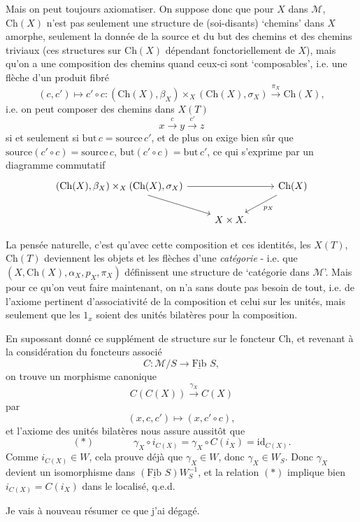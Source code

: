 \documentclass[11pt]{article}
\newcommand{\printedpage}[1]{\marginpar{\footnotesize p.~#1}}
\newcommand{\msp}[1]{\marginpar{\footnotesize [#1]}}
\newcommand{\Fib}{\underline{\mathrm{Fib}}\,}
\newcommand{\Ch}{\mathrm{Ch}}
\begin{document}
Mais on peut toujours axiomatiser. On suppose donc que pour $X$ dans $\mathcal{M}$, $\Ch(X)$
\msp{page 106}
n'est pas seulement une structure de (soi-disants) ‘chemins’ dans $X$ amorphe, seulement la donnée de la source et du but des chemins et des chemins triviaux (ces structures sur $\Ch(X)$ dépendant fonctoriellement de $X$), mais qu'on a une composition des chemins quand ceux-ci sont ‘composables’, i.e. une flèche d'un produit fibré
\[
(c,c')\longmapsto c'\circ c : (\Ch(X),\beta_X)\times_X(\Ch(X),\sigma_X)\xrightarrow{\pi_X}\Ch(X),
\]
i.e. on peut composer des chemins dans $X(T)$
\[
x\xrightarrow{c}y\xrightarrow{c'}z
\]
si et seulement si $\text{but}\,c=\text{source}\,c'$, et de plus on exige bien sûr que $\text{source}(c'\circ c)=\text{source}\,c$, $\text{but}(c'\circ c)=\text{but}\,c'$, ce qui s'exprime par un diagramme commutatif
\[
\begin{tikzcd}
(\Ch(X),\beta_X)\times_X(\Ch(X),\sigma_X) \arrow[rr] \arrow[dr] & & \Ch(X) \arrow[dl, "p_X"] \\
 & X\times X. &
\end{tikzcd}
\]


\printedpage{67}

La pensée naturelle, c'est qu'avec cette composition et ces identités, les $X(T)$, $\Ch(T)$ deviennent les objets et les flèches d'une \textit{catégorie} - i.e. que $(X,\Ch(X),\alpha_X,p_X,\pi_X)$ définissent une structure de ‘catégorie dans $\mathcal{M}$’. Mais pour ce qu'on veut faire maintenant, on n'a sans doute pas besoin de tout, i.e.
\msp{page 107}
de l'axiome pertinent d'associativité de la composition et celui sur les unités, mais seulement que les $1_x$ soient des unités bilatères pour la composition.

En supossant donné ce supplément de structure sur le foncteur Ch, et revenant à la considération du foncteurs associé %
\[
C : \mathcal{M}/S\longrightarrow\Fib\,S,
\]
on trouve un morphisme canonique
\[
C(C(X))\xrightarrow{\gamma_X}C(X)
\]
par
\[
(x,c,c')\longmapsto(x,c'\circ c),
\]
et l'axiome des unités bilatères nous assure aussitôt que
\[
(\ast)\qquad\qquad\gamma_X\circ i_{C(X)}=\gamma_X\circ C(i_X)=\mathrm{id}_{C(X)}.
\]
Comme $i_{C(X)}\in W$, cela prouve déjà que $\gamma_X\in W$, donc $\gamma_X\in W_S$. Donc $\gamma_X$ devient un isomorphisme dans $(\Fib\,S)W_S^{-1}$, et la relation $(\ast)$ implique bien $i_{C(X)}=C(i_X)$ dans le localisé, q.e.d.

Je vais à nouveau résumer ce que j'ai dégagé.
\end{document}

